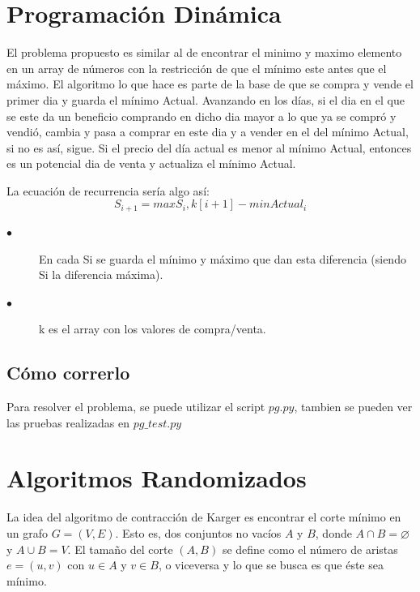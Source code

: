 \documentclass[a4paper,10pt]{article}
\begin{document}
\maketitle
\thispagestyle{empty}

\pagebreak 

\tableofcontents
\pagebreak

\clearpage
\section{Programación Dinámica}
El problema propuesto es similar al de encontrar el minimo y maximo elemento en un array de números con la restricción de que el mínimo este antes que el máximo.
El algoritmo lo que hace es parte de la base de que se compra y vende el primer dia y guarda el mínimo Actual. Avanzando en los días, si el dia en el que se este da un beneficio comprando en dicho dia mayor a lo que ya se compró y vendió, cambia y pasa a comprar en este dia y a vender en el del mínimo Actual, si no es así, sigue. Si el precio del día actual es menor al mínimo Actual, entonces es un potencial dia de venta y actualiza el mínimo Actual.
 
La ecuación de recurrencia sería algo así:
\begin{equation}
	\label{eq:pg}
	S_{i+1}={ max{S_i,k[i+1] - minActual_i}}
	\tag{1.1}
\end{equation}
\begin{description}
  \item[$\bullet$] En cada Si se guarda el mínimo y máximo que dan esta diferencia (siendo Si la diferencia máxima).
  \item[$\bullet$] k es el array con los valores de compra/venta.
\end{description}




\subsection{Cómo correrlo}

Para resolver el problema, se puede utilizar el script	 ${pg.py} $, tambien se pueden ver las pruebas realizadas en $ pg\_test.py$


\section{Algoritmos Randomizados}
La idea del algoritmo de contracción de Karger es encontrar el corte mínimo en un grafo $G=(V,E)$. Esto es, dos conjuntos no vacíos $A$ y $B$, donde $A \cap B = \varnothing$ y $A \cup B = V$. El tamaño del corte $(A,B)$ se define como el número de aristas $e = (u,v)$ con $u \in A$ y $v \in B$, o viceversa y lo que se busca es que éste sea mínimo.
\end{document}
